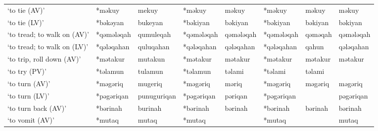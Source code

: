 \begin{landscape}
\begin{longtable}[c]{@{}p{3cm}<{\raggedright}p{2.75cm}<{\raggedright}p{2.75cm}<{\raggedright}p{2.75cm}<{\raggedright}p{2.75cm}<{\raggedright}p{2.75cm}<{\raggedright}p{2.75cm}<{\raggedright}p{2.75cm}<{\raggedright}@{}}
`to tie (AV)'                                        & *məkuy             & mekuy                          & *məkuy             & məkuy                      & *məkuy           & məkuy                    & məkuy                             \\
`to tie (LV)'                                        & *bəkəyan           & bukeyan                        & *bəkiyan           & bəkiyan                    & *bəkiyan         & bəkiyan                  & bəkiyan                           \\
`to tread; to walk on (AV)'                          & *qəmələqah         & qumuleqah                      & *qəmələqah         & qəmələqah                  & *qəmələqah       & qəməqah                  & qəmələqah                         \\
`to tread; to walk on (LV)'                          & *qələqahan         & quluqahan                      & *qələqahan         & qələqahan                  & *qələqahan       & qahun                    & qələqahan                         \\
`to trip, roll down (AV)'                            & *mətakur           & mutakun                        & *mətakur           & mətakur                    & *mətakur         & mətakur                  & mətakur                           \\
`to try (PV)'                                        & *təlamun           & tulamun                        & *təlamun           & təlami                     & *təlami          & təlami                   &                                   \\
`to turn (AV)'                                       & *məgəriq           & mugeriq                        & *məgəriq           & məriq                      & *məgəriq         & məgəriq                  & məgəriq                           \\
`to turn (LV)'                                       & *pəgəriqan         & punuguriqan                    & *pəgəriqan         & pəriqan                    & *pəgəriqan       &                          & pəgəriqan                         \\
`to turn back (AV)'                                  & *bərinah           & burinah                        & *bərinah           & bərinah                    & *bərinah         & bərinah                  & bərinah                           \\
`to vomit (AV)'                                      & *mutaq             & mutaq                          & *mutaq             &                            & *mutaq           &                          & mutaq                             \\

\end{longtable}
\end{landscape}
